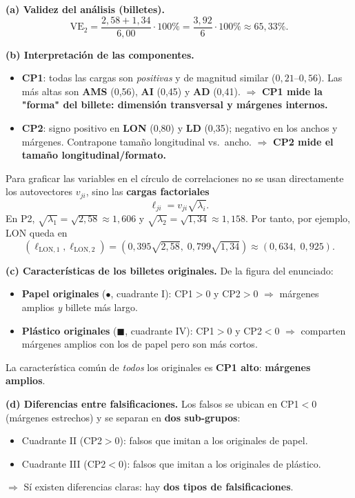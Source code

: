 \documentclass[11pt,a4paper]{article}
\begin{document}
\begin{solbox}
\textbf{(a) Validez del análisis (billetes).}
\[
\mathrm{VE}_2 = \frac{2{,}58+1{,}34}{6{,}00}\cdot 100\% = \frac{3{,}92}{6}\cdot 100\% \approx \boxed{65{,}33\%}.
\]

\textbf{(b) Interpretación de las componentes.}
\begin{itemize}[noitemsep,leftmargin=*]
\item \textbf{CP1}: todas las cargas son \emph{positivas} y de magnitud similar ($0{,}21$--$0{,}56$). Las más altas son \textbf{AMS} (0,56), \textbf{AI} (0,45) y \textbf{AD} (0,41). $\Rightarrow$ \textbf{CP1 mide la "forma" del billete: dimensión transversal y márgenes internos.}
\item \textbf{CP2}: signo positivo en \textbf{LON} (0,80) y \textbf{LD} (0,35); negativo en los anchos y márgenes. Contrapone tamaño longitudinal vs.\ ancho. $\Rightarrow$ \textbf{CP2 mide el tamaño longitudinal/formato.}
\end{itemize}

Para graficar las variables en el círculo de correlaciones no se usan directamente los autovectores $v_{ji}$, sino las \textbf{cargas factoriales}
\[
\ell_{ji}=v_{ji}\sqrt{\lambda_i}.
\]
En P2, $\sqrt{\lambda_1}=\sqrt{2{,}58}\approx1{,}606$ y $\sqrt{\lambda_2}=\sqrt{1{,}34}\approx1{,}158$. Por tanto, por ejemplo, LON queda en
\[
(\ell_{\mathrm{LON},1},\ell_{\mathrm{LON},2})=(0{,}395\sqrt{2{,}58},\;0{,}799\sqrt{1{,}34})\approx(0{,}634,\;0{,}925).
\]

\textbf{(c) Características de los billetes originales.} De la figura del enunciado:
\begin{itemize}[noitemsep,leftmargin=*]
\item \textbf{Papel originales} ($\bullet$, cuadrante I): CP1$>0$ y CP2$>0$ $\Rightarrow$ márgenes amplios \emph{y} billete más largo.
\item \textbf{Plástico originales} ($\blacksquare$, cuadrante IV): CP1$>0$ y CP2$<0$ $\Rightarrow$ comparten márgenes amplios con los de papel pero son más cortos.
\end{itemize}
La característica común de \emph{todos} los originales es \textbf{CP1 alto}: \textbf{márgenes amplios}.

\textbf{(d) Diferencias entre falsificaciones.} Los falsos se ubican en CP1$<0$ (márgenes estrechos) y se separan en \textbf{dos sub-grupos}:
\begin{itemize}[noitemsep,leftmargin=*]
\item Cuadrante II (CP2$>0$): falsos que imitan a los originales de papel.
\item Cuadrante III (CP2$<0$): falsos que imitan a los originales de plástico.
\end{itemize}
$\Rightarrow$ Sí existen diferencias claras: hay \textbf{dos tipos de falsificaciones}.


\end{solbox}
\end{document}
